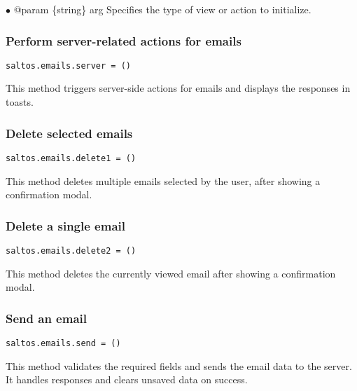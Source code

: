 \documentclass[a4paper]{article}
\begin{document}
\begin{compactitem}
\item[\color{myblue}$\bullet$] @param \{string\} arg Specifies the type of view or action to initialize.
\end{compactitem}

\hypertarget{toc70}{}
\subsubsection{Perform server-related actions for emails}

\begin{lstlisting}
saltos.emails.server = ()
\end{lstlisting}

This method triggers server-side actions for emails and displays the responses in toasts.

\hypertarget{toc71}{}
\subsubsection{Delete selected emails}

\begin{lstlisting}
saltos.emails.delete1 = ()
\end{lstlisting}

This method deletes multiple emails selected by the user, after showing a confirmation modal.

\hypertarget{toc72}{}
\subsubsection{Delete a single email}

\begin{lstlisting}
saltos.emails.delete2 = ()
\end{lstlisting}

This method deletes the currently viewed email after showing a confirmation modal.

\hypertarget{toc73}{}
\subsubsection{Send an email}

\begin{lstlisting}
saltos.emails.send = ()
\end{lstlisting}

This method validates the required fields and sends the email data to the server.
It handles responses and clears unsaved data on success.
\end{document}
